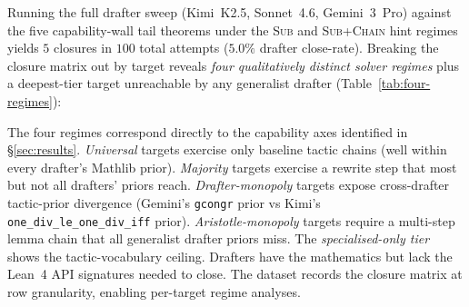 Running the full drafter sweep (Kimi~K2.5, Sonnet~4.6, Gemini~3~Pro)
against the five capability-wall tail theorems under the \textsc{Sub}
and \textsc{Sub+Chain} hint regimes yields $5$ closures in $100$ total
attempts ($5.0\%$ drafter close-rate). Breaking the
closure matrix out by target reveals \emph{four qualitatively
distinct solver regimes} plus a deepest-tier target unreachable by
any generalist drafter (Table~\ref{tab:four-regimes}):

\begin{table}[!t]
\centering
\caption{Four solver regimes in the no-closure tail. Cells are
(close count)/(attempt count) at $N \leq 9$ per drafter.
$^\dagger$Solver-unreached: no closure across (a) 3 drafters
$\times N=5$ greedy unhinted, (b) 3 drafters $\times$ asymmetric
\textsc{Sub}, (c) 3 drafters $\times N=5$ \textsc{Sub+Chain}, (d) 3
Aristotle attempts. $^\ddagger$Two Aristotle sessions timed out
at $20$~min. One returned a counterexample on the as-stated
form (\S\ref{sec:aristotle-refute}). We avoid claiming
\emph{fundamentally} unreachable.}
\label{tab:four-regimes}

\end{table}

The four regimes correspond directly to the capability axes identified
in \S\ref{sec:results}. \emph{Universal} targets exercise only baseline
tactic chains (well within every drafter's Mathlib prior).
\emph{Majority} targets exercise a rewrite step that most
but not all drafters' priors reach. \emph{Drafter-monopoly} targets
expose cross-drafter tactic-prior divergence (Gemini's \texttt{gcongr}
prior vs Kimi's \texttt{one\_div\_le\_one\_div\_iff} prior).
\emph{Aristotle-monopoly} targets require a multi-step lemma chain
that all generalist drafter priors miss. The
\emph{specialised-only tier} shows the tactic-vocabulary ceiling.
Drafters have the mathematics but lack the Lean~4 API signatures
needed to close. The dataset records the closure matrix at row
granularity, enabling per-target regime analyses.

